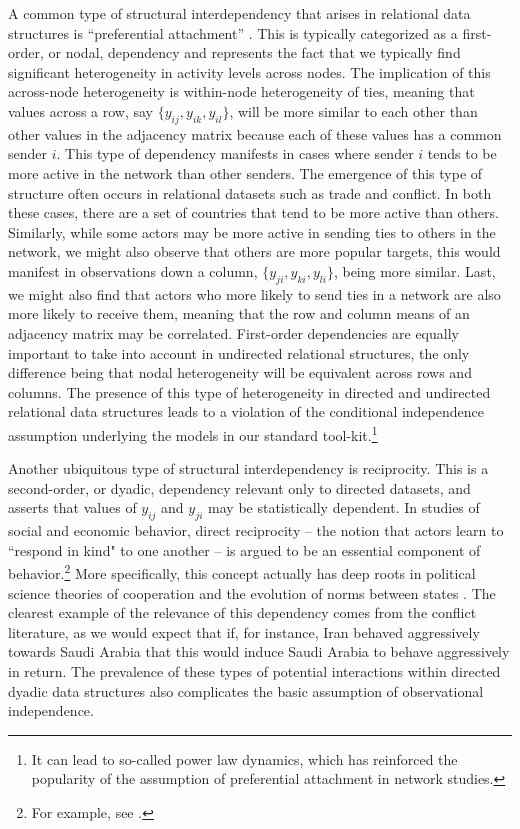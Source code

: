 A common type of structural interdependency that arises in relational data structures is ``preferential attachment'' \citep{barabasi:reka:1999,reka:etal:1999}. This is typically categorized as a first-order, or nodal, dependency and represents the fact that we typically find significant heterogeneity in activity levels across nodes. The implication of this across-node heterogeneity is within-node heterogeneity of ties, meaning that values across a row, say $\{y_{ij},y_{ik},y_{il}\}$, will be more similar to each other than other values in the adjacency matrix because each of these values has a common sender $i$. This type of dependency manifests in cases where sender $i$ tends to be more active in the network than other senders. The emergence of this type of structure often occurs in relational datasets such as trade and conflict. In both these cases, there are a set of countries that tend to be more active than others. Similarly, while some actors may be more active in sending ties to others in the network, we might also observe that others are more popular targets, this would manifest in observations down a column, $\{y_{ji},y_{ki},y_{li}\}$, being more similar. Last, we might also find that actors who more likely to send ties in a network are also more likely to receive them, meaning that the row and column means of an adjacency matrix may be correlated. First-order dependencies are equally important to take into account in undirected relational structures, the only difference being that nodal heterogeneity will be equivalent across rows and columns. The presence of this type of heterogeneity in directed and undirected relational data structures leads to a violation of the conditional independence assumption underlying the models in our standard tool-kit.\footnote{It can lead to so-called power law dynamics, which has reinforced the popularity of the assumption of preferential attachment in network studies.}

Another ubiquitous type of structural interdependency is reciprocity. This is a second-order, or dyadic, dependency relevant only to directed datasets, and asserts that values of $y_{ij}$ and $y_{ji}$ may be statistically dependent. In studies of social and economic behavior, direct reciprocity -- the notion that actors learn to ``respond in kind" to one another -- is argued to be an essential component of behavior.\footnote{For example, see \cite{bolton:1998, cox:2007}.} More specifically, this concept actually has deep roots in political science theories of cooperation and the evolution of norms between states \citep{richardson:1960,choucri:north:1972,keohane:1989,rajmaira:ward:1990,goldstein:freem:1990,goldstein:freeman:1991,ward:rajmair:1992,brandt:etal:2008}.  The clearest example of the relevance of this dependency comes from the conflict literature, as we would expect that if, for instance, Iran behaved aggressively towards Saudi Arabia that this would induce Saudi Arabia to behave aggressively in return. The prevalence of these types of potential interactions within directed dyadic data structures also complicates the basic assumption of observational independence.

